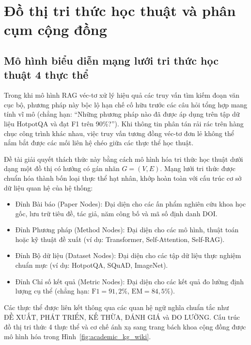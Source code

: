 \section{Đồ thị tri thức học thuật và phân cụm cộng đồng}
\label{sec:knowledge_graph_wiki}

\subsection{Mô hình biểu diễn mạng lưới tri thức học thuật 4 thực thể}
\label{subsec:academic_kg_model}
Trong khi mô hình RAG véc-tơ xử lý hiệu quả các truy vấn tìm kiếm đoạn văn cục bộ, phương pháp này bộc lộ hạn chế cố hữu trước các câu hỏi tổng hợp mang tính vĩ mô (chẳng hạn: ``Những phương pháp nào đã được áp dụng trên tập dữ liệu HotpotQA và đạt F1 trên 90\%?''). Khi thông tin phân tán rải rác trên hàng chục công trình khác nhau, việc truy vấn tương đồng véc-tơ đơn lẻ không thể nắm bắt được các mối liên hệ chéo giữa các thực thể học thuật.

Đề tài giải quyết thách thức này bằng cách mô hình hóa tri thức học thuật dưới dạng một đồ thị có hướng có gán nhãn $G = (V, E)$. Mạng lưới tri thức được chuẩn hóa thành bốn loại thực thể hạt nhân, khớp hoàn toàn với cấu trúc cơ sở dữ liệu quan hệ của hệ thống:
\begin{itemize}
    \item Đỉnh Bài báo (Paper Nodes): Đại diện cho các ấn phẩm nghiên cứu khoa học gốc, lưu trữ tiêu đề, tác giả, năm công bố và mã số định danh DOI.
    \item Đỉnh Phương pháp (Method Nodes): Đại diện cho các mô hình, thuật toán hoặc kỹ thuật đề xuất (ví dụ: Transformer, Self-Attention, Self-RAG).
    \item Đỉnh Bộ dữ liệu (Dataset Nodes): Đại diện cho các tập dữ liệu thực nghiệm chuẩn mực (ví dụ: HotpotQA, SQuAD, ImageNet).
    \item Đỉnh Chỉ số kết quả (Metric Nodes): Đại diện cho các kết quả đo lường định lượng cụ thể (chẳng hạn: $\text{F1} = 91{,}2\%$, $\text{EM} = 84{,}5\%$).
\end{itemize}

Các thực thể được liên kết thông qua các quan hệ ngữ nghĩa chuẩn tắc như $\text{ĐỀ XUẤT}$, $\text{PHÁT TRIỂN}$, $\text{KẾ THỪA}$, $\text{ĐÁNH GIÁ}$ và $\text{ĐO LƯỜNG}$. Cấu trúc đồ thị tri thức 4 thực thể và cơ chế ánh xạ sang trang bách khoa cộng đồng được mô hình hóa trong Hình~\ref{fig:academic_kg_wiki}.

